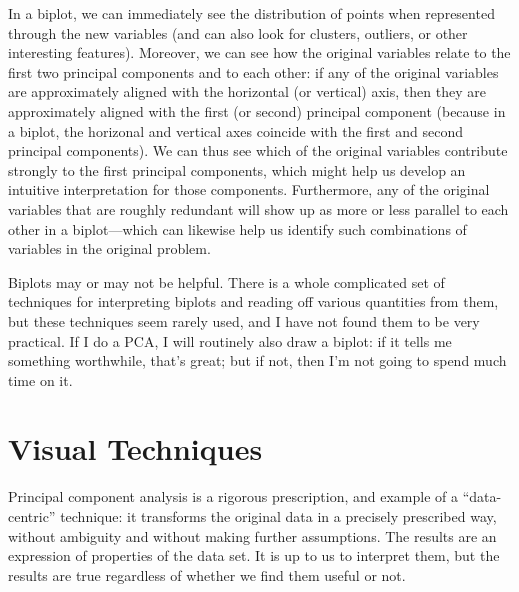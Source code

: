 In a biplot, we can immediately see the distribution of points when
represented through the new variables (and can also look for clusters,
outliers, or other interesting features). Moreover, we can see how the
original variables relate to the first two principal components and to
each other: if any of the original variables are approximately aligned
with the horizontal (or vertical) axis, then they are approximately
aligned with the first (or second) principal component (because in a
biplot, the horizonal and vertical axes coincide with the first and
second principal components). We can thus see which of the original
variables contribute strongly to the first principal components, which
might help us develop an intuitive interpretation for those
components.  Furthermore, any of the original variables that are
roughly redundant will show up as more or less parallel to each other
in a biplot---which can likewise help us identify such combinations of
variables in the original problem.

Biplots may or may not be helpful. There is a whole complicated set of
techniques for interpreting biplots and reading off various quantities
from them, but these techniques seem rarely used, and I have not found
them to be very practical.  If I do a PCA, I will routinely also draw
a biplot: if it tells me something worthwhile, that's great; but if
not, then I'm not going to spend much time on it.


% 

\section{Visual Techniques}


Principal component analysis is a rigorous prescription, and example
of a ``data-centric'' technique: it transforms the original data in a
precisely prescribed way, without ambiguity and without making further
assumptions. The results are an expression of properties of the data
set. It is up to us to interpret them, but the results are true
regardless of whether we find them useful or not.

